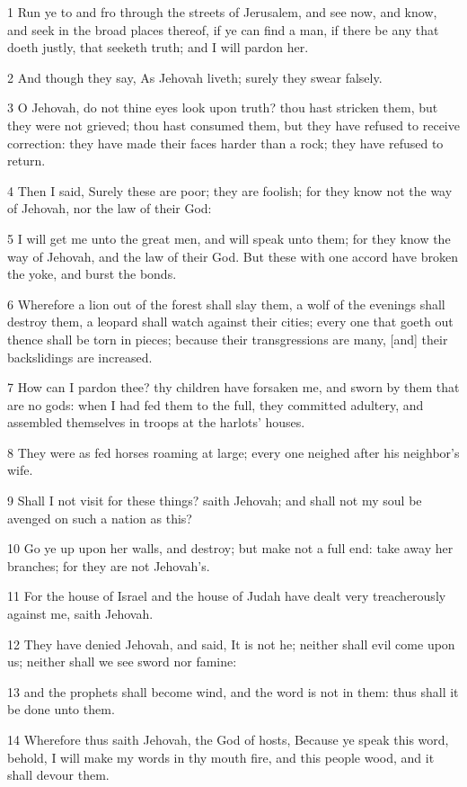 \par 1 Run ye to and fro through the streets of Jerusalem, and see now, and know, and seek in the broad places thereof, if ye can find a man, if there be any that doeth justly, that seeketh truth; and I will pardon her.
\par 2 And though they say, As Jehovah liveth; surely they swear falsely.
\par 3 O Jehovah, do not thine eyes look upon truth? thou hast stricken them, but they were not grieved; thou hast consumed them, but they have refused to receive correction: they have made their faces harder than a rock; they have refused to return.
\par 4 Then I said, Surely these are poor; they are foolish; for they know not the way of Jehovah, nor the law of their God:
\par 5 I will get me unto the great men, and will speak unto them; for they know the way of Jehovah, and the law of their God. But these with one accord have broken the yoke, and burst the bonds.
\par 6 Wherefore a lion out of the forest shall slay them, a wolf of the evenings shall destroy them, a leopard shall watch against their cities; every one that goeth out thence shall be torn in pieces; because their transgressions are many, [and] their backslidings are increased.
\par 7 How can I pardon thee? thy children have forsaken me, and sworn by them that are no gods: when I had fed them to the full, they committed adultery, and assembled themselves in troops at the harlots' houses.
\par 8 They were as fed horses roaming at large; every one neighed after his neighbor's wife.
\par 9 Shall I not visit for these things? saith Jehovah; and shall not my soul be avenged on such a nation as this?
\par 10 Go ye up upon her walls, and destroy; but make not a full end: take away her branches; for they are not Jehovah's.
\par 11 For the house of Israel and the house of Judah have dealt very treacherously against me, saith Jehovah.
\par 12 They have denied Jehovah, and said, It is not he; neither shall evil come upon us; neither shall we see sword nor famine:
\par 13 and the prophets shall become wind, and the word is not in them: thus shall it be done unto them.
\par 14 Wherefore thus saith Jehovah, the God of hosts, Because ye speak this word, behold, I will make my words in thy mouth fire, and this people wood, and it shall devour them.
